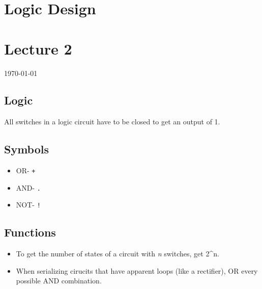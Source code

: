 \documentclass[12pt]{article}
\begin{document}
{\centering
\section*{Logic Design}
\section*{Lecture 2}
\indent\today
}

\subsection*{Logic}
All switches in a logic circuit have to be closed to get an output of 1.

\subsection*{Symbols}
\begin{itemize}
    \item OR- \texttt{+}
    \item AND- \texttt{.}
    \item NOT- \texttt{!}
\end{itemize}

\subsection*{Functions}
\begin{itemize}
    \item To get the number of states of a circuit with \textit{n} switches, get 2^n.
    \item When serializing cirucits that have apparent loops (like a rectifier), OR every possible AND combination.
\end{itemize}
\end{document}
